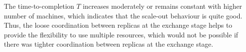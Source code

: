 \documentclass{rspublic}
\newcommand{\alnote}[1]{ {\textcolor{blue} { ***andre: #1 }}}
\newcommand{\alnote}[1]{}
\begin{document}
The time-to-completion $T$ increases
moderately or remains constant with higher number of machines, which
indicates that the scale-out behaviour is quite good.  %
Thus, the loose coordination between replicas at the exchange stage helps to 
provide the flexibility to use multiple resources, which would not be possible if
there was tighter coordination between replicas at the exchange stage.









\end{document}
